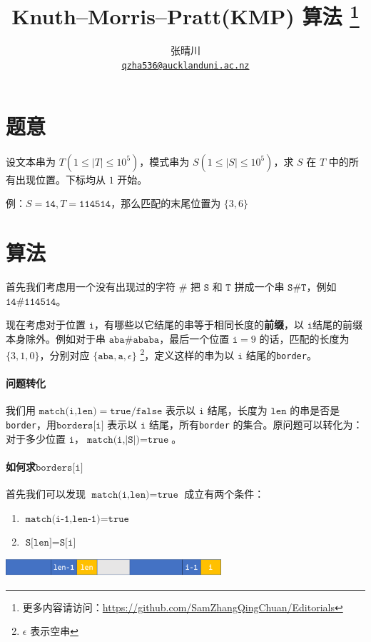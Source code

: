 \documentclass{article}
\title{Knuth–Morris–Pratt(KMP) 算法 \footnote{更多内容请访问：\url{https://github.com/SamZhangQingChuan/Editorials}}}
\author{张晴川\\\href{mailto:qzha536@aucklanduni.ac.nz}{\texttt{qzha536@aucklanduni.ac.nz}}}
\begin{document}
\maketitle

\section{题意}
设文本串为 $T(1\le |T| \le 10^5)$，模式串为 $S(1\le |S| \le 10^5)$，求 $S$ 在 $T$ 中的所有出现位置。下标均从 $1$ 开始。

例：$S = \texttt{14},T = \texttt{114514}$，那么匹配的末尾位置为 $\{3,6\}$


\section{算法}
首先我们考虑用一个没有出现过的字符 $\texttt{\#}$ 把 $\texttt{S}$ 和 $\texttt{T}$ 拼成一个串 $\texttt{S\#T}$，例如 $\texttt{14\#114514}$。

现在考虑对于位置 $\texttt{i}$，有哪些以它结尾的串等于相同长度的\textbf{前缀}，以 $\texttt{i}$结尾的前缀本身除外。例如对于串 $\texttt{aba\#ababa}$，最后一个位置 $\texttt{i} = 9$ 的话，匹配的长度为$\{3,1,0\}$，分别对应 $\{\texttt{aba},\texttt{a},\epsilon\}$ \footnote{$\epsilon$ 表示空串}，定义这样的串为以 $\texttt{i}$ 结尾的\texttt{border}。 

\paragraph{问题转化} 我们用 $\texttt{match(i,len)} = \texttt{true}/\texttt{false}$ 表示以 $\texttt{i}$ 结尾，长度为 $\texttt{len}$ 的串是否是 \texttt{border}，用$\texttt{borders[i]}$ 表示以 $\texttt{i}$ 结尾，所有\texttt{border} 的集合。原问题可以转化为：对于多少位置 $\texttt{i}$，$\texttt{match(i,|S|)} = \texttt{true}$。

\dotfill     

\paragraph{如何求$\texttt{borders[i]}$} 首先我们可以发现 $\texttt{match(i,len)} = \texttt{true}$ 成立有两个条件：
\begin{enumerate}
\item $\texttt{match(i-1,len-1)} = \texttt{true}$
\item $\texttt{S[len]} = \texttt{S[i]}$
\end{enumerate}
\begin{center}
\includegraphics[width=8cm]{1.png}
\end{center}
\end{document}
